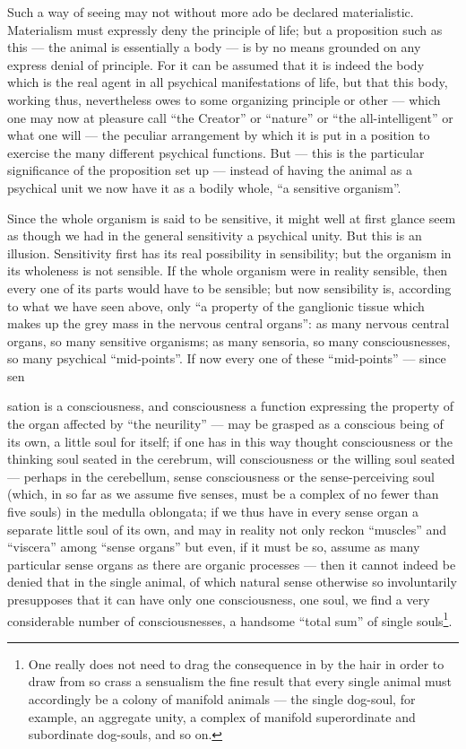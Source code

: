 \documentclass[12pt,a4paper]{book}
\begin{document}
Such a way of seeing may not without more ado be declared materialistic. Materialism
must expressly deny the principle of life; but a proposition such as this --- the
animal is essentially a body --- is by no means grounded on any express denial of
principle. For it can be assumed that it is indeed the body which is the real agent in
all psychical manifestations of life, but that this body, working thus, nevertheless
owes to some organizing principle or other --- which one may now at pleasure call
``the Creator'' or ``nature'' or ``the all-intelligent'' or what one will --- the
peculiar arrangement by which it is put in a position to exercise the many different
psychical functions. But --- this is the particular significance of the proposition
set up --- instead of having the animal as a psychical unit we now have it as a bodily
whole, ``a sensitive organism''.

Since the whole organism is said to be sensitive, it might well at first glance seem
as though we had in the general sensitivity a psychical unity. But this is an
illusion. Sensitivity first has its real possibility in sensibility; but the organism
in its wholeness is not sensible. If the whole organism were in reality sensible, then
every one of its parts would have to be sensible; but now sensibility is, according to
what we have seen above, only ``a property of the ganglionic tissue which makes up the
grey mass in the nervous central organs'': as many nervous central organs, so many
sensitive organisms; as many sensoria, so many consciousnesses, so many psychical
``mid-points''. If now every one of these ``mid-points'' --- since sen%

\setcounter{footnote}{0}%
sation is a consciousness, and consciousness a function expressing the property of the
organ affected by ``the neurility'' --- may be grasped as a conscious being of its
own, a little soul for itself; if one has in this way thought consciousness or the
thinking soul seated in the cerebrum, will consciousness or the willing soul seated
--- perhaps in the cerebellum, sense consciousness or the sense-perceiving soul (which,
in so far as we assume five senses, must be a complex of no fewer than five souls) in
the medulla oblongata; if we thus have in every sense organ a separate little soul of
its own, and may in reality not only reckon ``muscles'' and ``viscera'' among ``sense
organs'' but even, if it must be so, assume as many particular sense organs as there
are organic processes --- then it cannot indeed be denied that in the single animal,
of which natural sense otherwise so involuntarily presupposes that it can have only
one consciousness, one soul, we find a very considerable number of consciousnesses, a
handsome ``total sum'' of single souls\footnote{One really does not need to drag the
consequence in by the hair in order to draw from so crass a sensualism the fine result
that every single animal must accordingly be a colony of manifold animals --- the
single dog-soul, for example, an aggregate unity, a complex of manifold superordinate
and subordinate dog-souls, and so on.}.
\end{document}
